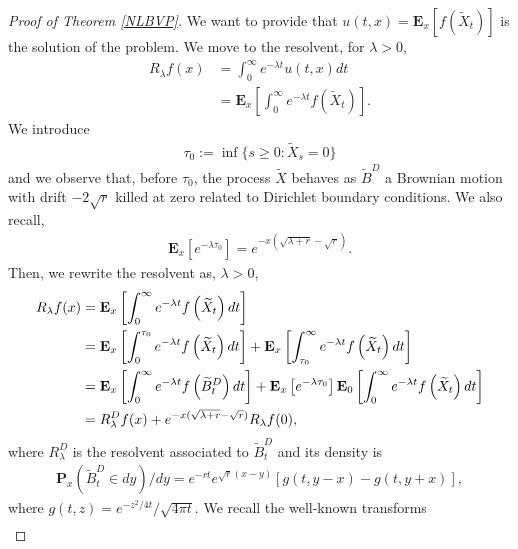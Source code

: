 \documentclass[11pt,a4paper]{article}
\theoremstyle{definition}
\theoremstyle{remark}
\begin{document}
\begin{proof}[Proof of Theorem \ref{NLBVP}]
	\label{proof:NLBVP}
	We want to provide that \(u(t,x)=\mathbf{E}_x[f (\widetilde{X}_t)]\) is the solution of the problem. We move to the resolvent, for \(\lambda>0\),
	\begin{align*}
		R_\lambda f(x)&=\int_0^\infty e^{-\lambda t} u(t,x) dt \\
		&=\mathbf{E}_x \left[\int_0^\infty e^{-\lambda t} f\left(\widetilde{X}_t\right)\right].
	\end{align*}
	We introduce
	\begin{align*}
		\tau_0:=\inf\{s \geq 0 : \widetilde{X}_s=0\}
	\end{align*}
	and we observe that, before $\tau_0$, the process $\widetilde{X}$ behaves as $\widetilde{B}^D$ a Brownian motion with drift $-2\sqrt{r}$ killed at zero related to Dirichlet boundary conditions. We also recall, \cite[Formula 2.0.1, page 295]{BorodinSalminen}
	\begin{align*}
		\mathbf{E}_x\left[e^{-\lambda \tau_0}\right]=e^{-x(\sqrt{\lambda+ r} - \sqrt{r})}.
	\end{align*}
	Then, we rewrite the resolvent as, $\lambda>0$,
	\begin{align}
		\label{resolvent}
		R_\lambda f(x) &= \mathbf{E}_x\left[ \int_0^\infty e^{-\lambda t} f \left(\widetilde{X}_t \right) dt \right] \notag \\
		&=\mathbf{E}_x\left[ \int_0^{\tau_0} e^{-\lambda t} f \left(\widetilde{X}_t \right) dt \right] + \mathbf{E}_x\left[ \int_{\tau_0}^\infty e^{-\lambda t} f \left(\widetilde{X}_t \right) dt \right] \notag \\
		&=\mathbf{E}_x\left[ \int_0^\infty e^{-\lambda t} f \left(\widetilde{B}^D_t \right) dt \right] + \mathbf{E}_x\left[e^{-\lambda \tau_0}\right] \mathbf{E}_0\left[ \int_0^\infty e^{-\lambda t} f \left(\widetilde{X}_t \right) dt \right] \notag \\
		&= R_\lambda^D f(x) + e^{-x(\sqrt{\lambda+ r} - \sqrt{r})} R_\lambda f(0),
	\end{align}
	where $R_\lambda^D$ is the resolvent associated to $\widetilde{B}^D_t$ and its density is
	\begin{align*}
		\mathbf{P}_x(\widetilde{B}^D_t \in dy)/dy = e^{- rt} e^{\sqrt{r}(x-y)} \left[g(t,y-x) - g(t,y+x)\right],
	\end{align*}
	where  $g(t, z) = e^{-z^2/ 4t}/\sqrt{4 \pi t}$. 
	We recall the well-known transforms
	\begin{align}
		\label{gLap1}

\end{align}
\end{proof}
\end{document}
